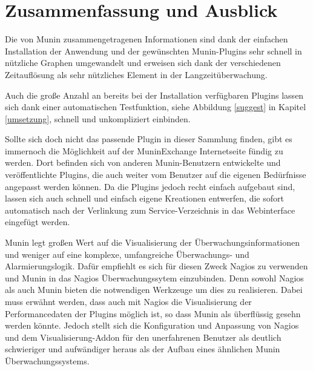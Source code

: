 \section{Zusammenfassung und Ausblick}
Die von Munin zusammengetragenen Informationen sind dank der einfachen Installation der Anwendung und der gewünschten Munin-Plugins sehr schnell in nützliche Graphen umgewandelt und erweisen sich dank der verschiedenen Zeitauflösung als sehr nützliches Element in der Langzeitüberwachung.

Auch die große Anzahl an bereits bei der Installation verfügbaren Plugins lassen sich dank einer automatischen Testfunktion, siehe Abbildung \ref{suggest} in Kapitel \ref{umsetzung}, schnell und unkompliziert einbinden.

Sollte sich doch nicht das passende Plugin in dieser Sammlung finden, gibt es immernoch die Möglichkeit auf der MuninExchange Internetseite fündig zu werden.
Dort befinden sich von anderen Munin-Benutzern entwickelte und veröffentlichte Plugins, die auch weiter vom Benutzer auf die eigenen Bedürfnisse angepasst werden können.
Da die Plugins jedoch recht einfach aufgebaut sind, lassen sich auch schnell und einfach eigene Kreationen entwerfen, die sofort automatisch nach der Verlinkung zum Service-Verzeichnis in das Webinterface eingefügt werden.

Munin legt großen Wert auf die Visualisierung der Überwachungsinformationen und weniger auf eine komplexe, umfangreiche Überwachungs- und Alarmierungslogik.
Dafür empfiehlt es sich für diesen Zweck Nagios zu verwenden und Munin in das Nagios Überwachungssytem einzubinden.
Denn sowohl Nagios als auch Munin bieten die notwendigen Werkzeuge um dies zu realisieren.
Dabei muss erwähnt werden, dass auch mit Nagios die Visualisierung der Performancedaten der Plugins möglich ist, so dass Munin als überflüssig gesehn werden könnte.
Jedoch stellt sich die Konfiguration und Anpassung von Nagios und dem Visualisierung-Addon für den unerfahrenen Benutzer als deutlich schwieriger und aufwändiger heraus als der Aufbau eines ähnlichen Munin Überwachungssystems.